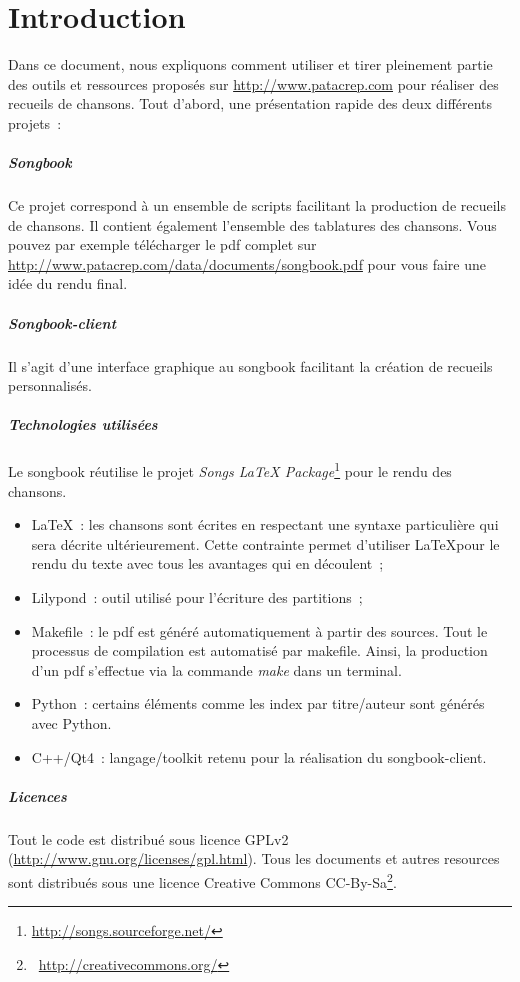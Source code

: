 \chapter*{Introduction}
\minitoc
\label{chap:introduction}

Dans ce document, nous expliquons comment utiliser et tirer pleinement
partie des outils et ressources proposés sur \url{http://www.patacrep.com} pour
réaliser des recueils de chansons. Tout d'abord, une présentation
rapide des deux différents projets~:

\paragraph{Songbook}
Ce projet correspond à un ensemble de scripts facilitant la production
de recueils de chansons. Il contient également l'ensemble des
tablatures des chansons. Vous pouvez par exemple télécharger le pdf
complet sur \url{http://www.patacrep.com/data/documents/songbook.pdf}
pour vous faire une idée du rendu final.

\paragraph{Songbook-client} 
Il s'agit d'une interface graphique au songbook facilitant la création
de recueils personnalisés.

\paragraph{Technologies utilisées} 
Le songbook réutilise le projet \emph{Songs LaTeX
  Package}\footnote{\url{http://songs.sourceforge.net/}} pour le rendu
des chansons.

\begin{itemize}
\item \LaTeX~: les chansons sont écrites en respectant une syntaxe
  particulière qui sera décrite ultérieurement. Cette contrainte
  permet d'utiliser \LaTeX pour le rendu du texte avec tous les
  avantages qui en découlent~;
\item Lilypond~: outil utilisé pour l'écriture des partitions~;
\item Makefile~: le pdf est généré automatiquement à partir des sources. Tout le processus
  de compilation est automatisé par makefile. Ainsi, la production d'un pdf s'effectue
  via la commande \emph{make} dans un terminal.
\item Python~: certains éléments comme les index par titre/auteur
  sont générés avec Python.
\item C++/Qt4~: langage/toolkit retenu pour la réalisation du songbook-client.
\end{itemize}

\paragraph{Licences}
Tout le code est distribué sous licence GPLv2
(\url{http://www.gnu.org/licenses/gpl.html}). Tous les documents et
autres resources sont distribués sous une licence Creative Commons
CC-By-Sa\footnote{\bysa~\url{http://creativecommons.org/}}.
